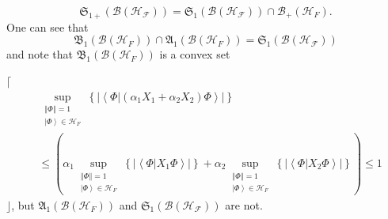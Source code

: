\documentclass[aps,preprint]{revtex4}%
\begin{document}
\begin{equation}
\mathfrak{S}_{1+}\left(  \mathcal{B}\left(  \mathcal{H}_{\mathcal{F}}\right)
\right)  =\mathfrak{S}_{1}\left(  \mathcal{B}\left(  \mathcal{H}_{\mathcal{F}%
}\right)  \right)  \cap\mathcal{B}_{+}\left(  \mathcal{H}_{F}\right)  .
\end{equation}
One can see that
\begin{equation}
\mathfrak{B}_{1}\left(  \mathcal{B}\left(  \mathcal{H}_{F}\right)  \right)
\cap\mathfrak{A}_{1}\left(  \mathcal{B}\left(  \mathcal{H}_{F}\right)
\right)  =\mathfrak{S}_{1}\left(  \mathcal{B}\left(  \mathcal{H}_{\mathcal{F}%
}\right)  \right)
\end{equation}
and note that $\mathfrak{B}_{1}\left(  \mathcal{B}\left(  \mathcal{H}%
_{F}\right)  \right)  $ is a convex set

$\lceil$%
\begin{align}
&  \sup_{\substack{\left\Vert \Phi\right\Vert =1\\\left\vert \Phi\right\rangle
\in\mathcal{H}_{F}}}\left\{  \left\vert \left\langle \left.  \Phi\right\vert
\left(  \alpha_{1}X_{1}+\alpha_{2}X_{2}\right)  \Phi\right\rangle \right\vert
\right\} \nonumber\\
&  \leq\left(  \alpha_{1}\sup_{\substack{\left\Vert \Phi\right\Vert
=1\\\left\vert \Phi\right\rangle \in\mathcal{H}_{F}}}\left\{  \left\vert
\left\langle \left.  \Phi\right\vert X_{1}\Phi\right\rangle \right\vert
\right\}  +\alpha_{2}\sup_{\substack{\left\Vert \Phi\right\Vert =1\\\left\vert
\Phi\right\rangle \in\mathcal{H}_{F}}}\left\{  \left\vert \left\langle \left.
\Phi\right\vert X_{2}\Phi\right\rangle \right\vert \right\}  \right)  \leq1
\end{align}
$\rfloor$, but $\mathfrak{A}_{1}\left(  \mathcal{B}\left(  \mathcal{H}%
_{F}\right)  \right)  $ and $\mathfrak{S}_{1}\left(  \mathcal{B}\left(
\mathcal{H}_{\mathcal{F}}\right)  \right)  $ are not.
\end{document}
